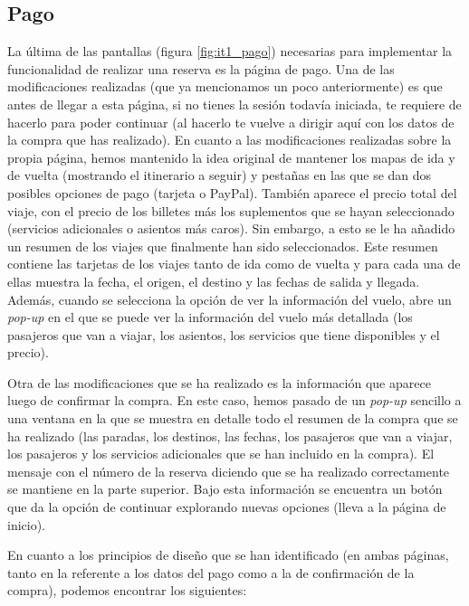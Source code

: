 \subsection*{Pago}

La última de las pantallas (figura \ref{fig:it1_pago}) necesarias para implementar la funcionalidad de realizar una reserva es la página de
pago. Una de las modificaciones realizadas (que ya mencionamos un poco anteriormente) es que antes de llegar a
esta página, si no tienes la sesión todavía iniciada, te requiere de hacerlo para poder continuar (al hacerlo te
vuelve a dirigir aquí con los datos de la compra que has realizado). En cuanto a las modificaciones realizadas
sobre la propia página, hemos mantenido la idea original de mantener los mapas de ida y de vuelta (mostrando el
itinerario a seguir) y pestañas en las que se dan dos posibles opciones de pago (tarjeta o PayPal). También
aparece el precio total del viaje, con el precio de los billetes más los suplementos que se hayan seleccionado
(servicios adicionales o asientos más caros). Sin embargo, a esto se le ha añadido un resumen de los viajes que
finalmente han sido seleccionados. Este resumen contiene las tarjetas de los viajes tanto de ida como de vuelta
y para cada una de ellas muestra la fecha, el origen, el destino y las fechas de salida y llegada. Además, cuando
se selecciona la opción de ver la información del vuelo, abre un \textit{pop-up} en el que se puede ver la información del
vuelo más detallada (los pasajeros que van a viajar, los asientos, los servicios que tiene disponibles y el precio). 

Otra de las modificaciones que se ha realizado es la información que aparece luego de confirmar la compra. En este
caso, hemos pasado de un \textit{pop-up} sencillo a una ventana en la que se muestra en detalle todo el resumen de la compra
que se ha realizado (las paradas, los destinos, las fechas, los pasajeros que van a viajar, los pasajeros y los
servicios adicionales que se han incluido en la compra). El mensaje con el número de la reserva diciendo que se ha
realizado correctamente se mantiene en la parte superior. Bajo esta información se encuentra un botón que da la
opción de continuar explorando nuevas opciones (lleva a la página de inicio). 

En cuanto a los principios de diseño que se han identificado (en ambas páginas, tanto en la referente a los datos
del pago como a la de confirmación de la compra), podemos encontrar los siguientes:

